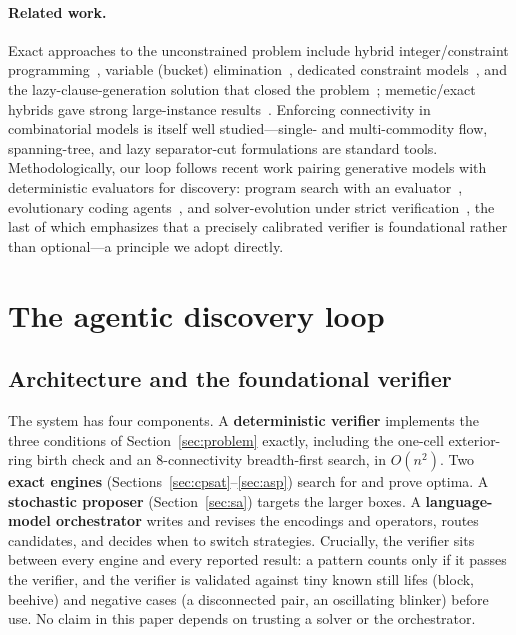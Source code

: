 \documentclass{article}
\begin{document}
\paragraph{Related work.} Exact approaches to the unconstrained problem include hybrid integer/constraint programming~\citep{bosch2004}, variable (bucket) elimination~\citep{larrosa2005}, dedicated constraint models~\citep{chu2010}, and the lazy-clause-generation solution that closed the problem~\citep{chu2012}; memetic/exact hybrids gave strong large-instance results~\citep{gallardo2009}. Enforcing connectivity in combinatorial models is itself well studied---single- and multi-commodity flow, spanning-tree, and lazy separator-cut formulations are standard tools. Methodologically, our loop follows recent work pairing generative models with deterministic evaluators for discovery: program search with an evaluator~\citep{funsearch}, evolutionary coding agents~\citep{alphaevolve}, and solver-evolution under strict verification~\citep{satlution}, the last of which emphasizes that a precisely calibrated verifier is foundational rather than optional---a principle we adopt directly.

\section{The agentic discovery loop}
\label{sec:method}

\subsection{Architecture and the foundational verifier}
The system has four components. A \textbf{deterministic verifier} implements the three conditions of Section~\ref{sec:problem} exactly, including the one-cell exterior-ring birth check and an $8$-connectivity breadth-first search, in $O(n^2)$. Two \textbf{exact engines} (Sections~\ref{sec:cpsat}--\ref{sec:asp}) search for and prove optima. A \textbf{stochastic proposer} (Section~\ref{sec:sa}) targets the larger boxes. A \textbf{language-model orchestrator} writes and revises the encodings and operators, routes candidates, and decides when to switch strategies. Crucially, the verifier sits between every engine and every reported result: a pattern counts only if it passes the verifier, and the verifier is validated against tiny known still lifes (block, beehive) and negative cases (a disconnected pair, an oscillating blinker) before use. No claim in this paper depends on trusting a solver or the orchestrator.
\end{document}
